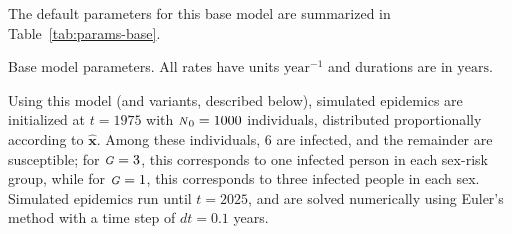 \documentclass[10pt]{article}
\numberwithin{equation}{section}
\newcommand{\N}{{\mbox{\footnotesize{\textit{N}}}}}
\newcommand{\G}{{\mbox{\footnotesize{\textit{G}}}}}
\newcommand{\tab}[1]{Table~\ref{#1}}
\begin{document}
The default parameters for this base model are summarized in
\tab{tab:params-base}.
\begin{table}[b]
  \centering\caption{Base model parameters. All rates have units $\mathrm{year}^{-1}$ and durations are in $\mathrm{years}$.}
  \label{tab:params-base}
  
\end{table}
\par
Using this model (and variants, described below),
simulated epidemics are initialized at $t = 1975$ with $\N_0 = 1000$ individuals,
distributed proportionally according to $\bm{\hat{x}}$.
Among these individuals, 6 are infected, and the remainder are susceptible;
for $\G = 3$, this corresponds to one infected person in each sex-risk group,
while for $\G = 1$, this corresponds to three infected people in each sex.
Simulated epidemics run until $t = 2025$,
and are solved numerically using Euler's method with a time step of $dt = 0.1$ years.
\end{document}

